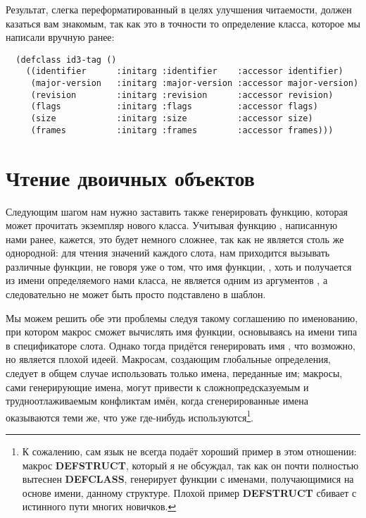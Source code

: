 Результат, слегка переформатированный в целях улучшения читаемости, должен казаться вам
знакомым, так как это в точности то определение класса, которое мы написали вручную ранее:

\begin{lstlisting}
  (defclass id3-tag ()
    ((identifier      :initarg :identifier    :accessor identifier)
     (major-version   :initarg :major-version :accessor major-version)
     (revision        :initarg :revision      :accessor revision)
     (flags           :initarg :flags         :accessor flags)
     (size            :initarg :size          :accessor size)
     (frames          :initarg :frames        :accessor frames)))
\end{lstlisting}

\section{Чтение двоичных объектов}

Следующим шагом нам нужно заставить  также генерировать функцию,
которая может прочитать экземпляр нового класса. Учитывая функцию ,
написанную нами ранее, кажется, это будет немного сложнее, так как  не
является столь же однородной: для чтения значений каждого слота, нам приходится вызывать
различные функции, не говоря уже о том, что имя функции, , хоть и
получается из имени определяемого нами класса, не является одним из аргументов
, а следовательно не может быть просто подставлено в шаблон.

Мы можем решить обе эти проблемы следуя такому соглашению по именованию, при котором
макрос сможет вычислять имя функции, основываясь на имени типа в спецификаторе
слота. Однако тогда  придётся генерировать имя
, что возможно, но является плохой идеей. Макросам, создающим
глобальные определения, следует в общем случае использовать только имена, переданные им;
макросы, сами генерирующие имена, могут привести к сложнопредсказуемым и
трудноотлаживаемым конфликтам имён, когда сгенерированные имена оказываются теми же, что
уже где-нибудь используются\footnote{К сожалению, сам язык не всегда подаёт хороший пример
  в этом отношении: макрос \textbf{DEFSTRUCT}, который я не обсуждал, так как он почти
  полностью вытеснен \textbf{DEFCLASS}, генерирует функции с именами, получающимися на
  основе имени, данному структуре. Плохой пример \textbf{DEFSTRUCT} сбивает с истинного
  пути многих новичков.}.


